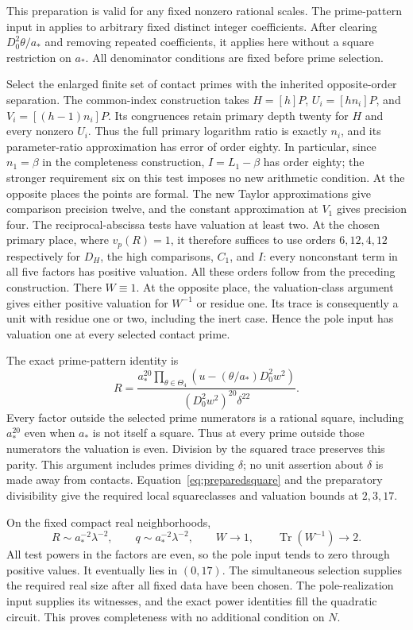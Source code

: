 \documentclass[11pt,a4paper]{article}
\DeclareMathOperator{\Tr}{Tr}\DeclareMathOperator{\Nm}{Nm}
\begin{document}
This preparation is valid for any fixed nonzero rational scales.
The prime-pattern input in \cite{Selection,Dependencies} applies to
arbitrary fixed distinct integer coefficients. After clearing
$D_0^2\theta/a_*$ and removing repeated coefficients, it applies
here without a square restriction on $a_*$. All denominator
conditions are fixed before prime selection.

Select the enlarged finite set of contact primes with the inherited
opposite-order separation. The common-index construction takes $H=[h]P$,
$U_i=[hn_i]P$, and $V_i=[(h-1)n_i]P$. Its congruences retain primary
depth twenty for $H$ and every nonzero $U_i$. Thus the full primary
logarithm ratio is exactly $n_i$, and its parameter-ratio approximation
has error of order eighty. In particular, since $n_1=\beta$ in the
completeness construction, $I=L_1-\beta$ has order eighty; the stronger
requirement six on this test imposes no new arithmetic condition. At the opposite places the points are formal. The new
Taylor approximations give comparison precision twelve, and the
constant approximation at $V_1$ gives precision four. The reciprocal-abscissa tests have valuation at least two. At the
chosen primary place, where $v_p(R)=1$, it therefore suffices to use
orders $6,12,4,12$ respectively for $D_H$, the high comparisons,
$C_1$, and $I$: every nonconstant term in all five factors has
positive valuation. All these orders follow from the preceding
construction. There $W\equiv1$. At the opposite
place, the valuation-class argument gives either positive valuation
for $W^{-1}$ or residue one. Its trace is consequently a unit with
residue one or two, including the inert case. Hence the pole input
has valuation one at every selected contact prime.

The exact prime-pattern identity is
\[
 R=\frac{\displaystyle a_*^{20}\prod_{\theta\in\Theta_4}
          (u-(\theta/a_*)D_0^2w^2)}
        {(D_0^2w^2)^{20}\delta^{22}}.
\]
Every factor outside the selected prime numerators is a rational
square, including $a_*^{20}$ even when $a_*$ is not itself a square.
Thus at every prime outside those numerators the valuation is even. Division by the squared trace
preserves this parity. This argument includes primes dividing $\delta$;
no unit assertion about $\delta$ is made away from contacts.
Equation~\eqref{eq:preparedsquare} and the preparatory divisibility
give the required local squareclasses and valuation bounds at $2,3,17$.

On the fixed compact real neighborhoods,
\[
 R\sim a_*^{-2}\lambda^{-2},\qquad
 q\sim a_*^{-2}\lambda^{-2},\qquad
 W\longrightarrow1,\qquad\Tr(W^{-1})\longrightarrow2.
\]
All test powers in the factors are even, so the pole input tends to
zero through positive values. It eventually lies in $(0,17)$.
The simultaneous selection supplies the required real size after all
fixed data have been chosen. The pole-realization input supplies its
witnesses, and the exact power identities fill the quadratic circuit.
This proves completeness with no additional condition on $N$.
\end{document}
